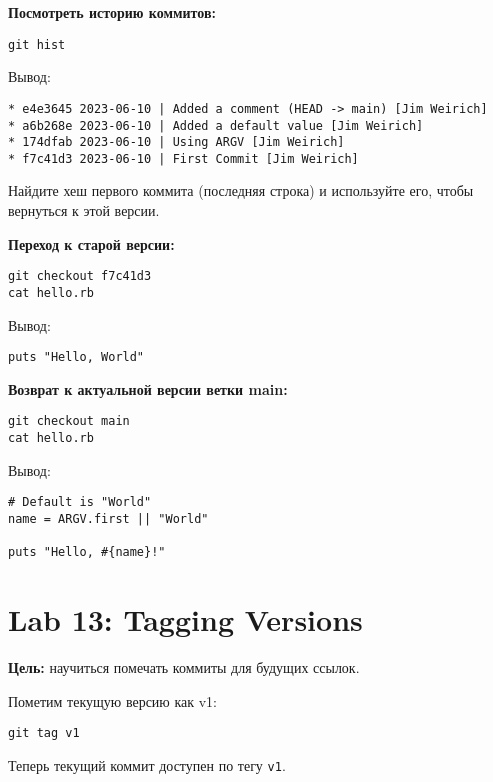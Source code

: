 \documentclass[a4paper,12pt]{report}
\begin{document}
\textbf{Посмотреть историю коммитов:}
\begin{verbatim}
git hist
\end{verbatim}

Вывод:
\begin{verbatim}
* e4e3645 2023-06-10 | Added a comment (HEAD -> main) [Jim Weirich]
* a6b268e 2023-06-10 | Added a default value [Jim Weirich]
* 174dfab 2023-06-10 | Using ARGV [Jim Weirich]
* f7c41d3 2023-06-10 | First Commit [Jim Weirich]
\end{verbatim}

Найдите хеш первого коммита (последняя строка) и используйте его, чтобы вернуться к этой версии.

\textbf{Переход к старой версии:}
\begin{verbatim}
git checkout f7c41d3
cat hello.rb
\end{verbatim}

Вывод:
\begin{verbatim}
puts "Hello, World"
\end{verbatim}


\textbf{Возврат к актуальной версии ветки main:}
\begin{verbatim}
git checkout main
cat hello.rb
\end{verbatim}

Вывод:
\begin{verbatim}
# Default is "World"
name = ARGV.first || "World"

puts "Hello, #{name}!"
\end{verbatim}


\section{Lab 13: Tagging Versions}
\textbf{Цель:} научиться помечать коммиты для будущих ссылок.

Пометим текущую версию как v1:
\begin{verbatim}
git tag v1
\end{verbatim}

Теперь текущий коммит доступен по тегу \texttt{v1}.
\end{document}
